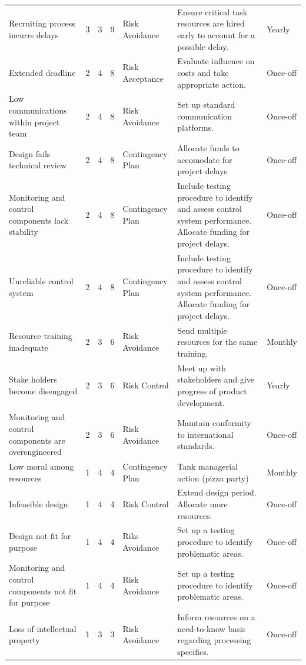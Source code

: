 \begin{appendices}
\begin{landscape}
\begin{table}[H]
{\begin{tabular}{lllllll}
Recruiting process incurrs delays & 3 & 3 & \cellcolor[HTML]{F8FF00}9 & Risk Avoidance & Ensure critical task resources are hired early to account for a possible delay. & Yearly \\
Extended deadline & 2 & 4 & \cellcolor[HTML]{F8FF00}8 & Risk Acceptance & Evaluate influence on costs and take appropriate action. & Once-off \\
Low communications within project team & 2 & 4 & \cellcolor[HTML]{F8FF00}8 & Risk Avoidance & Set up standard communication platforms. & Once-off \\
Design fails technical review & 2 & 4 & \cellcolor[HTML]{F8FF00}8 & Contingency Plan & Allocate funds to accomodate for project delays & Once-off \\
Monitoring and control components lack stability & 2 & 4 & \cellcolor[HTML]{F8FF00}8 & Contingency Plan & Include testing procedure to identify and assess control system performance. Allocate funding for project delays. & Once-off \\
Unreliable control system & 2 & 4 & \cellcolor[HTML]{F8FF00}8 & Contingency Plan & Include testing procedure to identify and assess control system performance. Allocate funding for project delays. & Once-off \\
Resource training inadequate & 2 & 3 & \cellcolor[HTML]{F8FF00}6 & Risk Avoidance & Send multiple resources for the same training. & Monthly \\
Stake holders become disengaged & 2 & 3 & \cellcolor[HTML]{F8FF00}6 & Risk Control & Meet up with stakeholders and give progress of product development. & Yearly \\
Monitoring and control components are overengineered & 2 & 3 & \cellcolor[HTML]{F8FF00}6 & Risk Avoidance & Maintain conformity to international standards. & Once-off \\
Low moral among resources & 1 & 4 & \cellcolor[HTML]{34FF34}4 & Contingency Plan & Tank managerial action (pizza party) & Monthly \\
Infeasible design & 1 & 4 & \cellcolor[HTML]{34FF34}4 & Risk Control & Extend design period. Allocate more resources. & Once-off \\
Design not fit for purpose & 1 & 4 & \cellcolor[HTML]{34FF34}4 & Riks Avoidance & Set up a testing procedure to identify problematic areas. & Once-off \\
Monitoring and control components not fit for purpose & 1 & 4 & \cellcolor[HTML]{34FF34}4 & Risk Avoidance & Set up a testing procedure to identify problematic areas. & Once-off \\
Loss of intellectual property & 1 & 3 & \cellcolor[HTML]{34FF34}3 & Risk Avoidance & Inform resources on a need-to-know basis regarding processing specifics. & Once-off
\end{tabular}%
}
\end{table}


\end{landscape}
\end{appendices}
